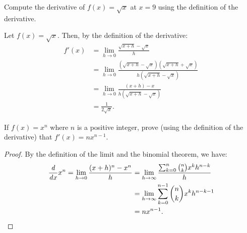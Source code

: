 \begin{problem}
  Compute the derivative of $f(x) = \sqrt{x}$ at $x = 9$ using the definition of the derivative.
  \vspace{\baselineskip}

  Let $f(x) = \sqrt{x}$. Then, by the definition of the derivative:
    \begin{align*}
      f'(x) &= \lim_{h \to 0}\frac{\sqrt{x+h} - \sqrt{x}}{h}\\
            &= \lim_{h \to 0}\frac{(\sqrt{x+h} - \sqrt{x})(\sqrt{x+h} + \sqrt{x})}{h(\sqrt{x+h} - \sqrt{x})}\\
            &= \lim_{h \to 0}\frac{(x + h) - x}{h(\sqrt{x+h} - \sqrt{x})}\\
            &= \frac{1}{2 \sqrt{x}}.
    \end{align*}
\end{problem}

\begin{problem}
  If $f(x) = x^{n}$ where $n$ is a positive integer, prove (using the definition of the derivative) that 
  $f'(x) = nx^{n-1}$.

  \begin{proof}
    By the definition of the limit and the binomial theorem, we have:
    \begin{align*}
       \dfrac{\mathit{d} }{\mathit{d} x} x^n = \lim_{h \to 0} \frac{(x + h)^{n} - x^{n}}{h} &= \lim_{h \to \infty} \frac{\sum_{k=0}^{n}\binom{n}{k}x^{k}h^{n-k}}{h}\\
                                                     &= \lim_{h \to \infty} \sum_{k=0}^{n-1}\binom{n}{k}x^{k}h^{n-k-1}\\
                                                     &= nx^{n-1}.
    \end{align*}
  \end{proof}
\end{problem}

